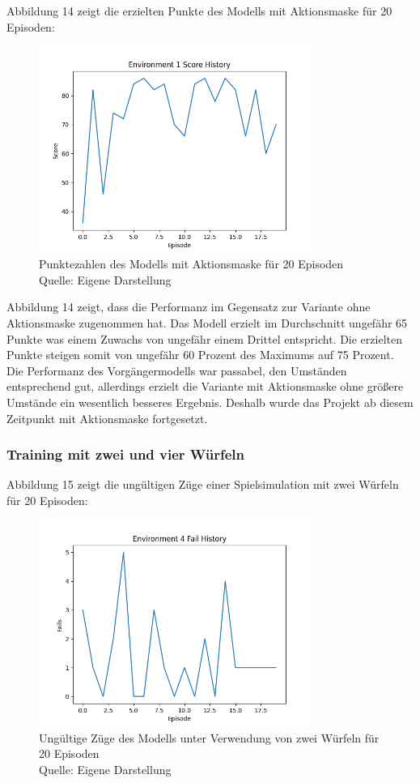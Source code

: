 Abbildung 14 zeigt die erzielten Punkte des Modells mit Aktionsmaske für 20 Episoden:
\nopagebreak
\begin{figure}[H]
	\centering
	\includegraphics[width=0.8\textwidth]{Bilder/trainingwithactionmask} 
	\caption[Punktezahlen des Modells mit Aktionsmaske für 20 Episoden]{Punktezahlen des Modells mit Aktionsmaske für 20 Episoden\\ Quelle: Eigene Darstellung}
\end{figure}

Abbildung 14 zeigt, dass die Performanz im Gegensatz zur Variante ohne Aktionsmaske zugenommen hat. Das Modell erzielt im Durchschnitt ungefähr 65 Punkte was einem Zuwachs von ungefähr einem Drittel entspricht. Die erzielten Punkte steigen somit von ungefähr 60 Prozent des Maximums auf 75 Prozent. Die Performanz des Vorgängermodells war passabel, den Umständen entsprechend gut, allerdings erzielt die Variante mit Aktionsmaske ohne größere Umstände ein wesentlich besseres Ergebnis. Deshalb wurde das Projekt ab diesem Zeitpunkt mit Aktionsmaske fortgesetzt.
\subsubsection{Training mit zwei und vier Würfeln}
Abbildung 15 zeigt die ungültigen Züge einer Spielsimulation mit zwei Würfeln für 20 Episoden:
\nopagebreak
\begin{figure}[H]
	\centering
	\includegraphics[width=0.8\textwidth]{Bilder/failswithtwodice} 
	\caption[Ungültige Züge des Modells unter Verwendung von zwei Würfeln für 20 Episoden]{Ungültige Züge des Modells unter Verwendung von zwei Würfeln für 20 Episoden\\ Quelle: Eigene Darstellung}
\end{figure}

